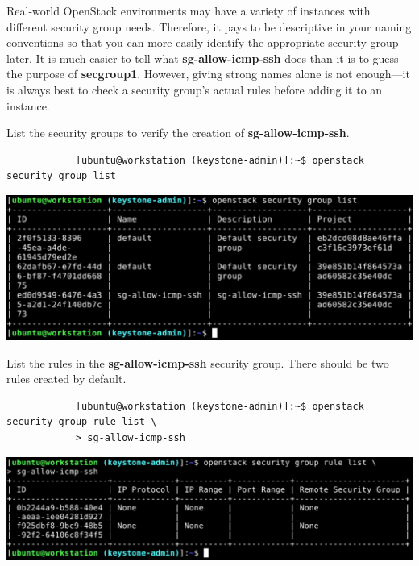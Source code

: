 \documentclass[letterpaper, 12pt]{article}
\begin{document}
\begin{enumerate}
    \begin{tipbox}
        Real-world OpenStack environments may have a variety of instances with different security group needs.
        Therefore, it pays to be descriptive in your naming conventions so that you can more easily identify the appropriate security group later.
        It is much easier to tell what \textbf{sg-allow-icmp-ssh} does than it is to guess the purpose of \textbf{secgroup1}.
        However, giving strong names alone is not enough---it is always best to check a security group's actual rules before adding it to an instance.
    \end{tipbox}

    \begin{labstep}
        List the security groups to verify the creation of \textbf{sg-allow-icmp-ssh}.
        \begin{lstlisting}
            [ubuntu@workstation (keystone-admin)]:~$ openstack security group list
        \end{lstlisting}

        \begin{center}
            \includegraphics[width=\linewidth]{images/part5/step24.png}
        \end{center}
    \end{labstep}

    \begin{labstep}
        List the rules in the \textbf{sg-allow-icmp-ssh} security group.
        There should be two rules created by default.
        \begin{lstlisting}
            [ubuntu@workstation (keystone-admin)]:~$ openstack security group rule list \
            > sg-allow-icmp-ssh
        \end{lstlisting}

        \begin{center}
            \includegraphics[width=\linewidth]{images/part5/step25.png}
        \end{center}
    \end{labstep}


\end{enumerate}
\end{document}
